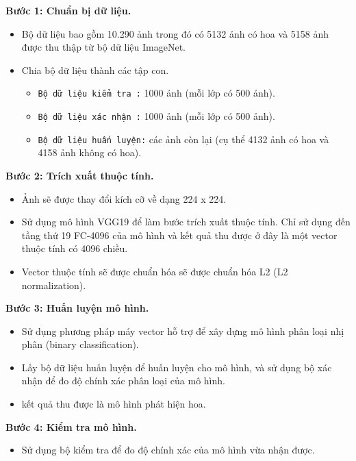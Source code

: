 \documentclass[12pt]{report}
\begin{document}
		\textbf{Bước 1: Chuẩn bị dữ liệu.} 
		\begin{itemize}
			\item Bộ dữ liệu bao gồm 10.290 ảnh trong đó có 5132 ảnh có hoa và 5158 ảnh được thu thập từ bộ dữ liệu ImageNet.
			\item Chia bộ dữ liệu thành các tập con.
			      \begin{itemize}
			      	\item \texttt{Bộ dữ liệu kiểm tra :} 1000 ảnh (mỗi lớp có 500 ảnh).
			      	\item \texttt{Bộ dữ liệu xác nhận :} 1000 ảnh (mỗi lớp có 500 ảnh).
			      	\item \texttt{Bộ dữ liệu huấn luyện:} các ảnh còn lại (cụ thể 4132 ảnh có hoa và 4158 ảnh không có hoa).
			      \end{itemize}
		\end{itemize}
														
		\textbf{Bước 2: Trích xuất thuộc tính.} 
		\begin{itemize}
			\item Ảnh sẽ được thay đổi kích cỡ về dạng 224 x 224.
			\item Sử dụng mô hình VGG19 \cite{cia_vgg19} để làm bước trích xuất thuộc tính. Chỉ sử dụng đến tầng thứ 19 FC-4096 của mô hình và kết quả thu được ở đây là một vector thuộc tính có 4096 chiều.
			\item Vector thuộc tính sẽ được chuẩn hóa sẽ được chuẩn hóa L2 (L2 normalization).
		\end{itemize}
										
		\textbf{Bước 3: Huấn luyện mô hình.} 
		\begin{itemize}
			\item Sử dụng phương pháp máy vector hỗ trợ để xây dựng mô hình phân loại nhị phân (binary classification). 
			\item Lấy bộ dữ liệu huấn luyện để huấn luyện cho mô hình, và sử dụng bộ xác nhận để đo độ chính xác phân loại của mô hình.
			\item kết quả thu được là mô hình phát hiện hoa.		      			      			      
		\end{itemize}
										
		\textbf{Bước 4: Kiểm tra mô hình.} 
		\begin{itemize}
			\item Sử dụng bộ kiểm tra để đo độ chính xác của mô hình vừa nhận được.
		\end{itemize}
										
										
		\newpage
\end{document}
